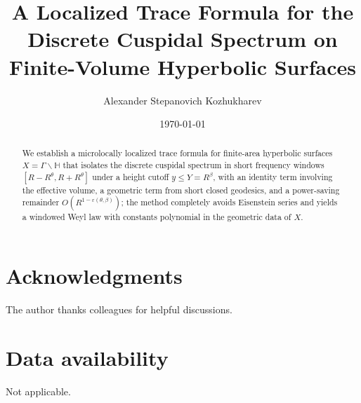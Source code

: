 \documentclass[12pt]{amsart}
\title[A Localized Trace Formula]{A Localized Trace Formula for the Discrete Cuspidal Spectrum on Finite-Volume Hyperbolic Surfaces}
\author{Alexander Stepanovich Kozhukharev}
\date{\today}
\numberwithin{equation}{section}
\theoremstyle{plain}
\theoremstyle{definition}
\theoremstyle{remark}
\newcommand{\HH}{\mathbb{H}}
\begin{document}
\begin{abstract}
We establish a microlocally localized trace formula for finite-area hyperbolic surfaces $X=\Gamma\backslash\HH$ that isolates the discrete cuspidal spectrum in short frequency windows $[R-R^\theta,R+R^\theta]$ under a height cutoff $y\le Y=R^\beta$, with an identity term involving the effective volume, a geometric term from short closed geodesics, and a power-saving remainder $O(R^{1-\varepsilon(\theta,\beta)})$; the method completely avoids Eisenstein series and yields a windowed Weyl law with constants polynomial in the geometric data of $X$.
\end{abstract}


\maketitle

\tableofcontents



\section*{Acknowledgments}
The author thanks colleagues for helpful discussions.

\section*{Data availability}
Not applicable.
\end{document}
